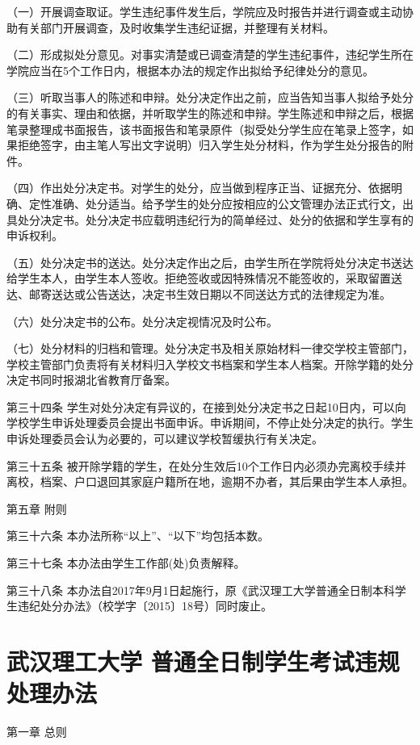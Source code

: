 \documentclass[UTF8,12pt,a4paper]{report}
\begin{document}
（一）开展调查取证。学生违纪事件发生后，学院应及时报告并进行调查或主动协助有关部门开展调查，及时收集学生违纪证据，并整理有关材料。

（二）形成拟处分意见。对事实清楚或已调查清楚的学生违纪事件，违纪学生所在学院应当在5个工作日内，根据本办法的规定作出拟给予纪律处分的意见。

（三）听取当事人的陈述和申辩。处分决定作出之前，应当告知当事人拟给予处分的有关事实、理由和依据，并听取学生的陈述和申辩。学生陈述和申辩之后，根据笔录整理成书面报告，该书面报告和笔录原件（拟受处分学生应在笔录上签字，如果拒绝签字，由主笔人写出文字说明）归入学生处分材料，作为学生处分报告的附件。

（四）作出处分决定书。对学生的处分，应当做到程序正当、证据充分、依据明确、定性准确、处分适当。给予学生的处分应按相应的公文管理办法正式行文，出具处分决定书。处分决定书应载明违纪行为的简单经过、处分的依据和学生享有的申诉权利。 

（五）处分决定书的送达。处分决定作出之后，由学生所在学院将处分决定书送达给学生本人，由学生本人签收。拒绝签收或因特殊情况不能签收的，采取留置送达、邮寄送达或公告送达，决定书生效日期以不同送达方式的法律规定为准。

（六）处分决定书的公布。处分决定视情况及时公布。

（七）处分材料的归档和管理。处分决定书及相关原始材料一律交学校主管部门，学校主管部门负责将有关材料归入学校文书档案和学生本人档案。开除学籍的处分决定书同时报湖北省教育厅备案。

第三十四条  学生对处分决定有异议的，在接到处分决定书之日起10日内，可以向学校学生申诉处理委员会提出书面申诉。申诉期间，不停止处分决定的执行。学生申诉处理委员会认为必要的，可以建议学校暂缓执行有关决定。

第三十五条  被开除学籍的学生，在处分生效后10个工作日内必须办完离校手续并离校，档案、户口退回其家庭户籍所在地，逾期不办者，其后果由学生本人承担。



第五章  附则

第三十六条  本办法所称“以上”、“以下”均包括本数。

第三十七条  本办法由学生工作部(处)负责解释。

第三十八条  本办法自2017年9月1日起施行，原《武汉理工大学普通全日制本科学生违纪处分办法》（校学字〔2015〕18号）同时废止。

\chapter{武汉理工大学 普通全日制学生考试违规处理办法}
第一章  总则
\end{document}
